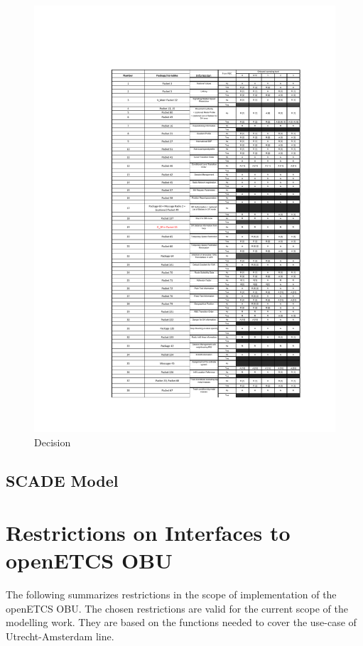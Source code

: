 \documentclass{template/openetcs_report}
\begin{document}
\begin{figure}[hbtp]
\centering
\includegraphics [scale=0.7]{images/Decisionsonfilter}
\caption{Decision}
\end{figure}
 \newpage

\section{SCADE Model}





 
\appendix{}

\chapter{Restrictions on Interfaces to openETCS OBU}
The following summarizes restrictions in the scope of implementation of the openETCS OBU. The chosen restrictions are valid for the current scope of the modelling work. They are based on the functions needed to cover the use-case of Utrecht-Amsterdam line.
\end{document}
